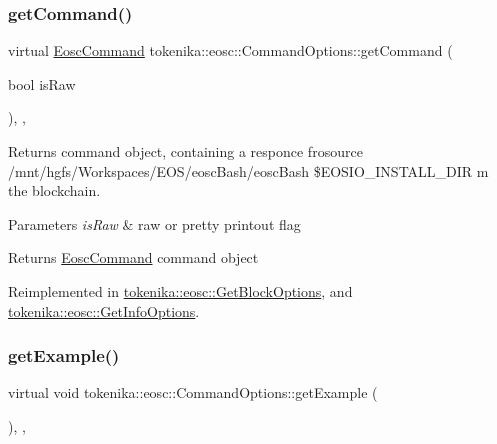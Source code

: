 \subsubsection{\texorpdfstring{get\+Command()}{getCommand()}}
{\footnotesize\ttfamily virtual \hyperlink{classtokenika_1_1eosc_1_1_eosc_command}{Eosc\+Command} tokenika\+::eosc\+::\+Command\+Options\+::get\+Command (\begin{DoxyParamCaption}\item[{bool}]{is\+Raw }\end{DoxyParamCaption})\hspace{0.3cm}{\ttfamily [inline]}, {\ttfamily [protected]}, {\ttfamily [virtual]}}



Returns command object, containing a responce frosource /mnt/hgfs/\+Workspaces/\+E\+O\+S/eosc\+Bash/eosc\+Bash \$\+E\+O\+S\+I\+O\+\_\+\+I\+N\+S\+T\+A\+L\+L\+\_\+\+D\+IR m the blockchain. 


\begin{DoxyParams}{Parameters}
{\em is\+Raw} & raw or pretty printout flag \\
\hline
\end{DoxyParams}
\begin{DoxyReturn}{Returns}
\hyperlink{classtokenika_1_1eosc_1_1_eosc_command}{Eosc\+Command} command object 
\end{DoxyReturn}


Reimplemented in \hyperlink{classtokenika_1_1eosc_1_1_get_block_options_ac1c5b62f162c4253cab8de5a93fe5cf9}{tokenika\+::eosc\+::\+Get\+Block\+Options}, and \hyperlink{classtokenika_1_1eosc_1_1_get_info_options_a7283bdc9a328ccd8a29a25bcdc01dfa6}{tokenika\+::eosc\+::\+Get\+Info\+Options}.

\mbox{\label{classtokenika_1_1eosc_1_1_command_options_ab1fe134b6c2230257a5c07b021812986}} 
\subsubsection{\texorpdfstring{get\+Example()}{getExample()}}
{\footnotesize\ttfamily virtual void tokenika\+::eosc\+::\+Command\+Options\+::get\+Example (\begin{DoxyParamCaption}{ }\end{DoxyParamCaption})\hspace{0.3cm}{\ttfamily [inline]}, {\ttfamily [protected]}, {\ttfamily [virtual]}}



